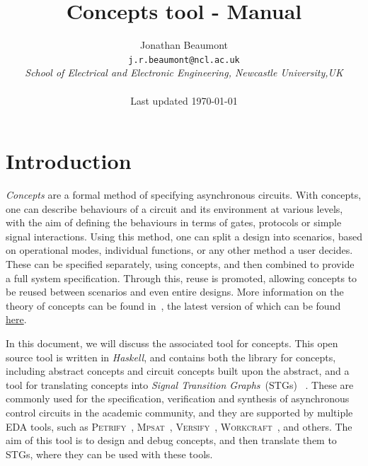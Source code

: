 \documentclass{proc}
\newcommand{\noun}[1]{\textsc{#1}}
\begin{document}
\title{Concepts tool - Manual}
\author{Jonathan Beaumont\\
\texttt{j.r.beaumont@ncl.ac.uk}\\
\emph{School of Electrical and Electronic Engineering, Newcastle University,UK}\\\\
Last updated \today}

\maketitle

\tableofcontents

\onecolumn

\section{Introduction}

\emph{Concepts} are a formal method of specifying asynchronous circuits. With concepts, one can describe behaviours of a circuit and its environment at various levels, with the aim of
defining the behaviours in terms of gates, protocols or simple signal interactions. Using this method, one can split a design into scenarios, based on operational modes, individual functions, or 
any other method a user decides. These can be specified separately, using concepts, and then combined to provide a full system specification. Through this, reuse is promoted,
 allowing concepts to be reused between scenarios and even entire designs. More information on the theory of concepts can be found in~\cite{2016_beaumont_concepts}, the latest version 
of which can be found \href{https://github.com/tuura/concepts-article/releases}{here}.

In this document, we will discuss the associated tool for concepts. This open source tool is written in \emph{Haskell}, and contains both the library for concepts, 
including abstract concepts and circuit concepts built upon the abstract, and a tool for translating concepts into \emph{Signal Transition Graphs}~(STGs)~\cite{Chu_1987_phd}
\cite{Rosenblum_1985_tpn}. These are commonly used for the specification, verification and synthesis of asynchronous control circuits in the academic community, and 
they are supported by multiple EDA tools, such as \noun{Petrify}~\cite{Cortadella}, \noun{Mpsat}~\cite{khomenko2004detecting}, \noun{Versify}~\cite{i1997formal}, 
\noun{Workcraft}~\cite{2007_poliakov_workcraft}\cite{Workcraft_website}, and others.  
The aim of this tool is to design and debug concepts, and then translate them to STGs, where they can be used with these tools. 
\end{document}
